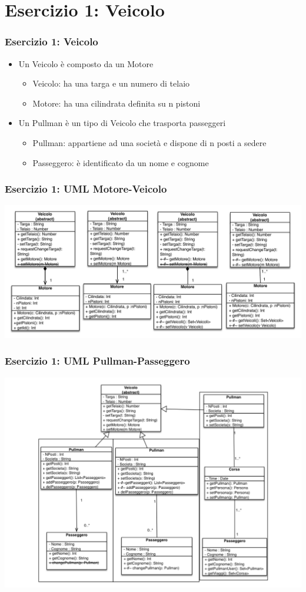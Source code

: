 \documentclass{beamer}
\begin{document}
\section{Esercizio 1: Veicolo}
\begin{frame}
\frametitle{Esercizio 1: Veicolo}
\begin{itemize}
\item Un Veicolo \`e composto da un Motore
\begin{itemize}
\item Veicolo: ha una targa e un numero di telaio
\item Motore: ha una cilindrata definita su n pistoni
\end{itemize}
\item  Un Pullman \`e un tipo di Veicolo che trasporta passeggeri
\begin{itemize}
\item Pullman: appartiene ad una societ\`a e dispone di n posti a sedere
\item Passeggero: \`e identificato da un nome e cognome
\end{itemize}
\end{itemize}
\end{frame}


\begin{frame}
\frametitle{Esercizio 1: UML Motore-Veicolo}
\includegraphics[scale=0.50]{Img/motoreveicolo.pdf}

\end{frame}

\begin{frame}
\frametitle{Esercizio 1: UML Pullman-Passeggero}
\includegraphics[scale=0.38]{Img/pullmanpasseggero.pdf}

\end{frame}
\end{document}
